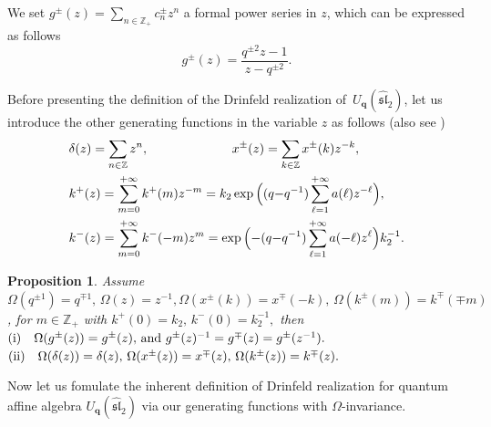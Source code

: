 \documentclass[12pt]{amsart}
\newtheorem{proposition}[theorem]{Proposition}
\numberwithin{equation}{section}
\numberwithin{equation}{section}
\begin{document}
We set \(g^{\pm}(z)=\sum\limits_{n\in\mathbb{Z}_+}c^{\pm}_n z^n\) a formal power series in \(z\), which can be expressed as follows \cite{HRZ, HZ}
\[g^{\pm}(z)=\frac{q^{\pm 2}z-1}{z-q^{\pm 2}}.\]

Before presenting the definition of the Drinfeld realization of \(\,U_{\textbf{q}}(\widehat{\mathfrak{sl}}_2)\), 
let us introduce the other generating functions in the variable \(z\) as follows (also see \cite{HRZ,HZ})
\begin{align*} &\delta(z)=\sum\limits_{n\in\mathbb{Z}}z^n,\hspace{2.3cm} x^{\pm}(z)=\sum\limits_{k\in\mathbb{Z}}x^{\pm}(k)z^{-k},\\ 
&k^+(z)=\sum\limits_{m=0}^{+\infty}k^+(m) z^{-m}=k_2 \exp \Big( (q{-}q^{-1})\sum\limits_{\ell=1}^{+\infty}  a(\ell)z^{-\ell}\Big),\\  
&k^-(z)=\sum\limits_{m=0}^{+\infty}k^-(-m) z^{m}=\exp \Big({-}(q{-}q^{-1}) \sum\limits_{\ell=1}^{+\infty}a(-\ell)z^{\ell}\Big)k^{-1}_2.
\end{align*}
\begin{proposition} 
Assume \(\Omega(q^{\pm1})=q^{\mp1}, \,\Omega(z)=z^{-1}, \Omega(x^{\pm}(k))=x^{\mp}(-k), \,\Omega(k^{\pm}(m))=k^{\mp}(\mp m)\), for \(m\in\mathbb{Z}_+\) with \(k^+(0)=k_2,\, k^-(0)=k^{-1}_2,\) then\\
\((\text{\rm i})\quad\Omega(g^{\pm}(z))=g^{\pm}(z), \,\text{and} \,\,g^{\pm}(z)^{-1}=g^{\mp}(z)=g^{\pm}(z^{-1}).\)\\
\((\text{\rm ii})\quad \Omega(\delta(z))=\delta(z),\, \Omega(x^{\pm}(z))=x^{\mp}(z),\, \Omega(k^{\pm}(z))=k^{\mp}(z).\)
\end{proposition}
Now let us fomulate the inherent definition of Drinfeld realization for quantum affine algebra \(U_{\textbf{q}}(\widehat{\mathfrak{sl}}_2)\) via our generating functions with \(\Omega\)-invariance.
\end{document}
